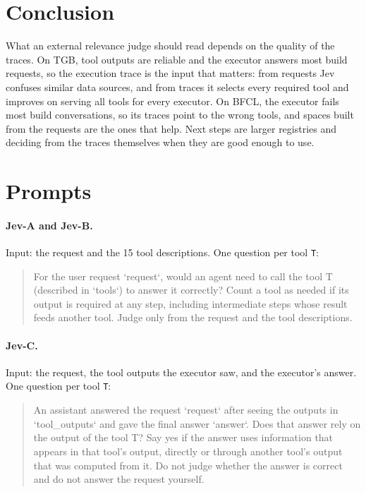 \documentclass[11pt]{tea}
\newcommand{\JA}{Jev-A}
\newcommand{\JB}{Jev-B}
\newcommand{\JC}{Jev-C}
\begin{document}
\section{Conclusion}

What an external relevance judge should read depends on the quality of the traces. On TGB, tool outputs are reliable and the executor answers most build requests, so the execution trace is the input that matters: from requests Jev confuses similar data sources, and from traces it selects every required tool and improves on serving all tools for every executor. On BFCL, the executor fails most build conversations, so its traces point to the wrong tools, and spaces built from the requests are the ones that help. Next steps are larger registries and deciding from the traces themselves when they are good enough to use.



\beginappendix

\section{Prompts}
\label{app:prompts}

\paragraph{\JA{} and \JB{}.} Input: the request and the 15 tool descriptions. One question per tool \texttt{T}:
\begin{quote}\small\ttfamily
For the user request `request`, would an agent need to call the tool T (described in `tools`) to answer it correctly? Count a tool as needed if its output is required at any step, including intermediate steps whose result feeds another tool. Judge only from the request and the tool descriptions.
\end{quote}

\paragraph{\JC{}.} Input: the request, the tool outputs the executor saw, and the executor's answer. One question per tool \texttt{T}:
\begin{quote}\small\ttfamily
An assistant answered the request `request` after seeing the outputs in `tool\_outputs` and gave the final answer `answer`. Does that answer rely on the output of the tool T? Say yes if the answer uses information that appears in that tool's output, directly or through another tool's output that was computed from it. Do not judge whether the answer is correct and do not answer the request yourself.
\end{quote}
\end{document}
